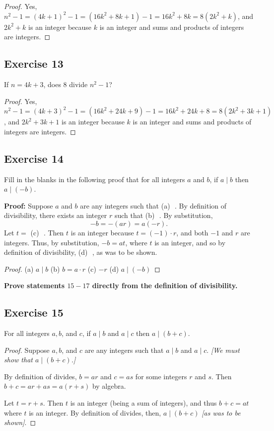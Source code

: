 \documentclass[14pt]{extarticle}
\newcommand{\fbl}{\underline{\hspace{1cm}}\,\,}
\newcommand{\cy}{\color{cyan}}
\begin{document}
\begin{proof}
Yes, $n^2 - 1 = (4k + 1)^2 - 1 = (16k^2 + 8k + 1) - 1 =
16k^2 + 8k = 8(2k^2 + k)$, and $2k^2 + k$ is an integer because $k$ is an integer and sums and products of integers are integers.
\end{proof}

\subsection{Exercise 13}
If $n = 4k + 3$, does 8 divide $n^2 - 1$?

\begin{proof}
Yes, $n^2 - 1 = (4k + 3)^2 - 1 = (16k^2 + 24k + 9) - 1 =
16k^2 + 24k + 8 = 8(2k^2 + 3k + 1)$, and $2k^2 + 3k + 1$ is an integer because $k$ is an integer and sums and products of integers are integers.
\end{proof}

\subsection{Exercise 14}
Fill in the blanks in the following proof that for all integers $a$ and $b$, if $a \mid b$ then $a \mid (-b)$.

{\bf Proof:} Suppose $a$ and $b$ are any integers such that
{\cy (a)} \fbl. By definition of divisibility, there exists an integer $r$ such that {\cy (b)} \fbl. By substitution, 
\[
-b = -(ar) = a(-r).
\]
Let $t = $ {\cy(c)} \fbl. Then $t$ is an integer because $t = (-1)\cdot r$, and both $-1$ and $r$ are integers. Thus, by substitution, $-b = at$, where $t$ is an integer, and so by definition of divisibility, {\cy (d)} \fbl, as was to be shown.

\begin{proof}
(a) $a \mid b$ (b) $b = a \cdot r$ (c) $-r$ (d) $a \mid (-b)$
\end{proof}

{\bf \cy Prove statements $15-17$ directly from the definition of divisibility.}

\subsection{Exercise 15}
For all integers $a, b$, and $c$, if $a \mid b$ and $a \mid c$ then $a \mid (b + c)$.

\begin{proof}
Suppose $a, b$, and $c$ are any integers such that $a\mid b$ and $a \mid c$. {\it [We must show that $a \mid (b + c)$.]} 

By definition of divides, $b = ar$ and $c = as$ for some integers $r$ and $s$. Then $b + c = ar + as = a(r + s)$ by algebra.

Let $t = r + s$. Then $t$ is an integer (being a sum of integers), and thus $b + c = at$ where $t$ is an integer. By definition of divides, then, $a \mid (b + c)$ {\it [as was to be shown]}.
\end{proof}
\end{document}
